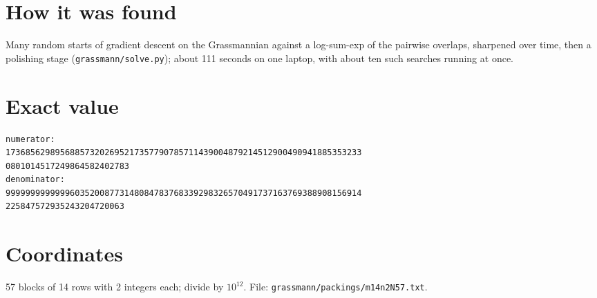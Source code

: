 \documentclass[11pt,a4paper]{article}
\begin{document}
\section{How it was found}
Many random starts of gradient descent on the Grassmannian against a log-sum-exp of the pairwise overlaps, sharpened over time, then a polishing stage (\texttt{grassmann/solve.py}); about 111 seconds on one laptop, with about ten such searches running at once.


\appendix
\section{Exact value}
{\small
\begin{verbatim}
numerator:
173685629895688573202695217357790785711439004879214512900490941885353233
0801014517249864582402783
denominator:
999999999999960352008773148084783768339298326570491737163769388908156914
225847572935243204720063
\end{verbatim}}

\section{Coordinates}
57 blocks of 14 rows with 2 integers each; divide by $10^{12}$. File: \texttt{grassmann/packings/m14n2N57.txt}.
{\tiny
\begin{multicols}{4}
\end{multicols}}
\end{document}
